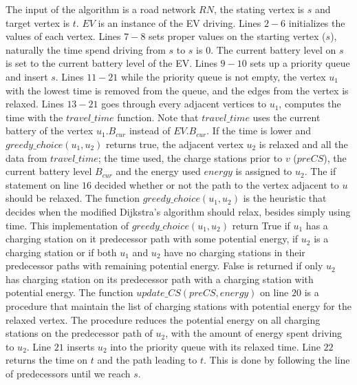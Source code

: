 The input of the algorithm is a road network $RN$, the stating vertex is $s$ and target vertex is $t$. $EV$ is an instance of the EV driving. Lines $2-6$ initializes the values of each vertex. Lines $7-8$ sets proper values on the starting vertex ($s$), naturally the time spend driving from $s$ to $s$ is $0$. The current battery level on $s$ is set to the current battery level of the EV. Lines $9-10$ sets up a priority queue and insert $s$. Lines $11-21$ while the priority queue is not empty, the vertex $u_1$ with the lowest time is removed from the queue, and the edges from the vertex is relaxed. Lines $13-21$ goes through every adjacent vertices to $u_1$, computes the time with the $travel\_time$ function. Note that $travel\_time$ uses the current battery of the vertex $u_1.B_{cur}$ instead of $EV.B_{cur}$. If the time is lower and $greedy\_choice(u_1, u_2)$ returns true, the adjacent vertex $u_2$ is relaxed and all the data from $travel\_time$; the time used, the charge stations prior to $v$ ($preCS$), the current battery level $B_{cur}$ and the energy used $energy$ is assigned to $u_2$. The if statement on line $16$ decided whether or not the path to the vertex adjacent to $u$ should be relaxed. The function $greedy\_choice(u_1,u_2)$ is the heuristic that decides when the modified Dijkstra's algorithm should relax, besides simply using time. This implementation of $greedy\_choice(u_1,u_2)$ return True if $u_1$ has a charging station on it predecessor path with some potential energy, if $u_2$ is a charging station or if both $u_1$ and $u_2$ have no charging stations in their predecessor paths with remaining potential energy. False is returned if only $u_2$ has charging station on its predecessor path with a charging station with potential energy.
The function $update\_CS(preCS, energy)$ on line $20$ is a procedure that maintain the list of charging stations with potential energy for the relaxed vertex. The procedure reduces the potential energy on all charging stations on the predecessor path of $u_2$, with the amount of energy spent driving to $u_2$. Line $21$ inserts $u_2$ into the priority queue with its relaxed time. Line $22$ returns the time on $t$ and the path leading to $t$. This is done by following the line of predecessors until we reach $s$.

